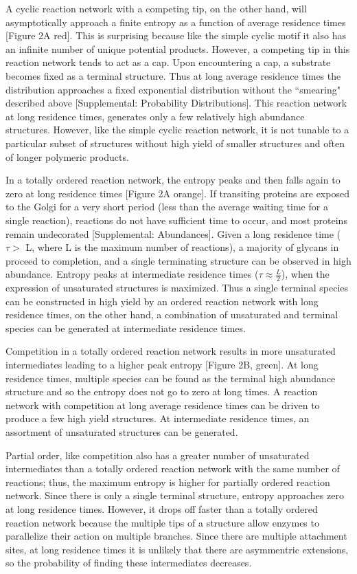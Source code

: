 \documentclass[twocolumn]{article}
\begin{document}
A cyclic reaction network with a competing tip, on the other hand, will asymptotically approach a finite entropy as a function of average residence times  [Figure 2A red]. This is surprising because like the simple cyclic motif it also has an infinite number of unique potential products. However, a competing tip in this reaction network tends to act as a cap. Upon encountering a cap, a substrate becomes fixed as a terminal structure. Thus at long average residence times the distribution approaches a fixed exponential distribution without the ``smearing" described above [Supplemental: Probability Distributions]. This reaction network at long residence times, generates only a few relatively high abundance structures. However, like the simple cyclic reaction network, it is not tunable to a particular subset of structures without high yield of smaller structures and often of longer polymeric products. 

In a totally ordered reaction network, the entropy peaks and then falls again to zero at long residence times [Figure 2A orange]. If transiting proteins are exposed to the Golgi for a very short period (less than the average waiting time for a single reaction), reactions do not have sufficient time to occur, and most proteins remain undecorated [Supplemental: Abundances]. Given a long residence time ($\tau >$ L, where L is the maximum number of reactions), a majority of glycans in proceed to completion, and a single terminating structure can be observed in high abundance. Entropy peaks at intermediate residence times ($\tau\approx\frac{L}{2}$), when the expression of unsaturated structures is maximized. Thus a single terminal species can be constructed in high yield by an ordered reaction network with long residence times, on the other hand, a combination of unsaturated and terminal species can be generated at intermediate residence times. 

Competition in a totally ordered reaction network results in more unsaturated intermediates leading to a higher peak entropy [Figure 2B, green]. At long residence times, multiple species can be found as the terminal high abundance structure and so the entropy does not go to zero at long times. A reaction network with competition at long average residence times can be driven to produce a few high yield structures. At intermediate residence times, an assortment of unsaturated structures can be generated.  

Partial order, like competition also has a greater number of unsaturated intermediates than a totally ordered reaction network with the same number of reactions; thus, the maximum entropy is higher for partially ordered reaction network. Since there is only a single terminal structure, entropy approaches zero at long residence times. However, it drops off faster than a totally ordered reaction network because the multiple tips of a structure allow enzymes to parallelize their action on multiple branches. Since there are multiple attachment sites, at long residence times it is unlikely that there are asymmentric extensions, so the probability of finding these intermediates decreases.
\end{document}

